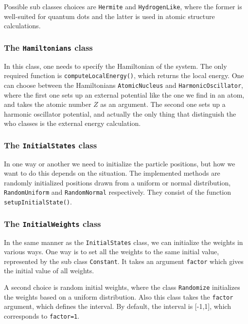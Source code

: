 Possible sub classes choices are \texttt{Hermite} and \texttt{HydrogenLike}, where the former is well-suited for quantum dots and the latter is used in atomic structure calculations. 

\subsubsection{The \texttt{Hamiltonians} class}
In this class, one needs to specify the Hamiltonian of the system. The only required function is \texttt{computeLocalEnergy()}, which returns the local energy. One can choose between the Hamiltonians \texttt{AtomicNucleus} and \texttt{HarmonicOscillator}, where the first one sets up an external potential like the one we find in an atom, and takes the atomic number $Z$ as an argument. The second one sets up a harmonic oscillator potential, and actually the only thing that distinguish the who classes is the external energy calculation. 

\subsubsection{The \texttt{InitialStates} class}
In one way or another we need to initialize the particle positions, but how we want to do this depends on the situation. The implemented methods are randomly initialized positions drawn from a uniform or normal distribution, \texttt{RandomUniform} and \texttt{RandomNormal} respectively. They consist of the function \texttt{setupInitialState()}.

\subsubsection{The \texttt{InitialWeights} class}
In the same manner as the \texttt{InitialStates} class, we can initialize the weights in various ways. One way is to set all the weights to the same initial value, represented by the sub class \texttt{Constant}. It takes an argument \texttt{factor} which gives the initial value of all weights.

A second choice is random initial weights, where the class \texttt{Randomize} initializes the weights based on a uniform distribution. Also this class takes the \texttt{factor} argument, which defines the interval. By default, the interval is [-1,1], which corresponds to \texttt{factor=1}.

